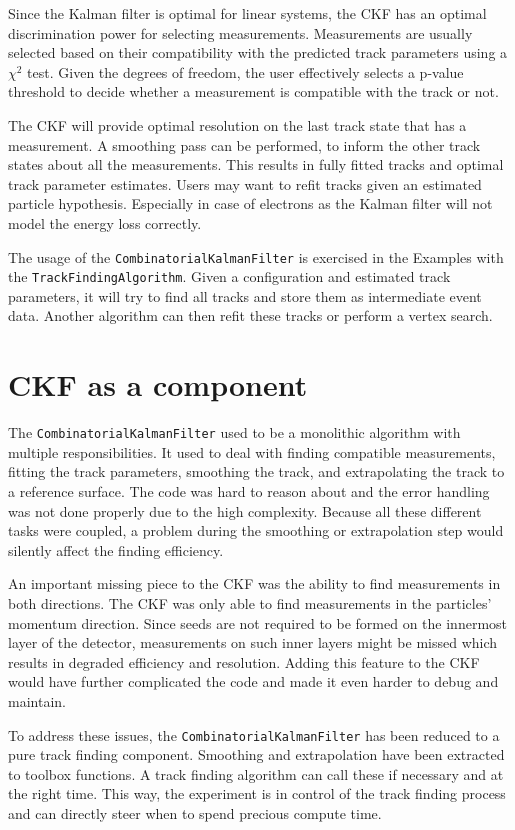 Since the Kalman filter is optimal for linear systems, the CKF has an optimal discrimination power for selecting measurements. Measurements are usually selected based on their compatibility with the predicted track parameters using a $\chi^2$ test. Given the degrees of freedom, the user effectively selects a p-value threshold to decide whether a measurement is compatible with the track or not.

The CKF will provide optimal resolution on the last track state that has a measurement. A smoothing pass can be performed, to inform the other track states about all the measurements. This results in fully fitted tracks and optimal track parameter estimates. Users may want to refit tracks given an estimated particle hypothesis. Especially in case of electrons as the Kalman filter will not model the energy loss correctly.

The usage of the \texttt{CombinatorialKalmanFilter} is exercised in the Examples with the \texttt{TrackFindingAlgorithm}. Given a configuration and estimated track parameters, it will try to find all tracks and store them as intermediate event data. Another algorithm can then refit these tracks or perform a vertex search.

\section{CKF as a component}

The \texttt{CombinatorialKalmanFilter} used to be a monolithic algorithm with multiple responsibilities. It used to deal with finding compatible measurements, fitting the track parameters, smoothing the track, and extrapolating the track to a reference surface. The code was hard to reason about and the error handling was not done properly due to the high complexity. Because all these different tasks were coupled, a problem during the smoothing or extrapolation step would silently affect the finding efficiency.

An important missing piece to the CKF was the ability to find measurements in both directions. The CKF was only able to find measurements in the particles' momentum direction. Since seeds are not required to be formed on the innermost layer of the detector, measurements on such inner layers might be missed which results in degraded efficiency and resolution. Adding this feature to the CKF would have further complicated the code and made it even harder to debug and maintain.

To address these issues, the \texttt{CombinatorialKalmanFilter} has been reduced to a pure track finding component. Smoothing and extrapolation have been extracted to toolbox functions. A track finding algorithm can call these if necessary and at the right time. This way, the experiment is in control of the track finding process and can directly steer when to spend precious compute time.

